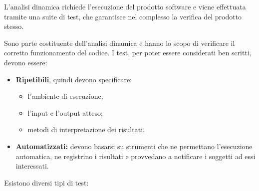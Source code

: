           L'analisi dinamica richiede l'esecuzione del prodotto software e viene effettuata tramite una suite di test, che garantisce nel complesso la verifica del prodotto stesso.

        Sono parte costituente dell'analisi dinamica e hanno lo scopo di verificare il corretto funzionamento del codice. I test, per poter essere considerati ben scritti, devono essere:
        \begin{itemize}
          \item \textbf{Ripetibili}, quindi devono specificare:
            \begin{itemize}
              \item l'ambiente di esecuzione;
              \item l'input e l'output atteso;
              \item metodi di interpretazione dei risultati.
            \end{itemize}
          \item \textbf{Automatizzati:} devono basarsi su strumenti che ne permettano l'esecuzione automatica, ne registrino i risultati e provvedano a notificare i soggetti ad essi interessati.
        \end{itemize}
        Esistono diversi tipi di test:
